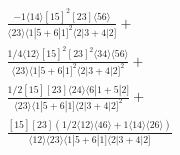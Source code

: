 \documentclass[varwidth, border=5pt]{standalone}
\begin{document}
\begin{my}
$\begin{gathered}
\scriptscriptstyle\frac{-1⟨14⟩[15]^2[23]⟨56⟩}{⟨23⟩⟨1|5+6|1]^2⟨2|3+4|2]}+\\
\scriptscriptstyle\frac{1/4⟨12⟩[15]^2[23]^2⟨34⟩⟨56⟩}{⟨23⟩⟨1|5+6|1]^2⟨2|3+4|2]^2}+\\
\scriptscriptstyle\frac{1/2[15][23]⟨24⟩⟨6|1+5|2]}{⟨23⟩⟨1|5+6|1]⟨2|3+4|2]^2}+\\
\scriptscriptstyle\frac{[15][23](1/2⟨12⟩⟨46⟩+1⟨14⟩⟨26⟩)}{⟨12⟩⟨23⟩⟨1|5+6|1]⟨2|3+4|2]}\phantom{+}
\end{gathered}$
\end{my}
\end{document}
